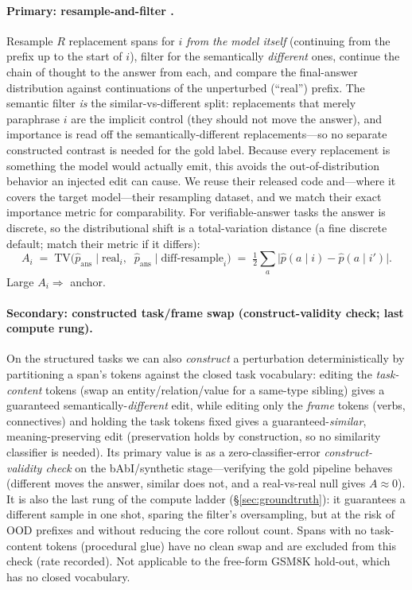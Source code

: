 \documentclass[11pt]{article}
\begin{document}
\paragraph{Primary: resample-and-filter \cite{bogdan2025thought}.} Resample $R$ replacement spans for
$i$ \emph{from the model itself} (continuing from the prefix up to the start of $i$), filter for the
semantically \emph{different} ones, continue the chain of thought to the answer from each, and compare
the final-answer distribution against continuations of the unperturbed (``real'') prefix. The semantic
filter \emph{is} the similar-vs-different split: replacements that merely paraphrase $i$ are the
implicit control (they should not move the answer), and importance is read off the
semantically-different replacements---so no separate constructed contrast is needed for the gold label.
Because every replacement is something the model would actually emit, this avoids the
out-of-distribution behavior an injected edit can cause. We reuse their released code and---where it
covers the target model---their resampling dataset, and we match their exact importance metric for
comparability. For verifiable-answer tasks the answer is discrete, so the distributional shift is a
total-variation distance (a fine discrete default; match their metric if it differs):
\begin{equation}
A_i \;=\; \mathrm{TV}\!\Big(\hat p_{\text{ans}}\!\mid\!\text{real}_i,\;\;\hat p_{\text{ans}}\!\mid\!\text{diff-resample}_i\Big)
\;=\;\tfrac12\sum_a\big|\hat p(a\mid i)-\hat p(a\mid i')\big|.
\label{eq:label}
\end{equation}
Large $A_i\Rightarrow$ anchor.

\paragraph{Secondary: constructed task/frame swap (construct-validity check; last compute rung).}
On the structured tasks we can also \emph{construct} a perturbation deterministically by partitioning a
span's tokens against the closed task vocabulary: editing the \emph{task-content} tokens (swap an
entity/relation/value for a same-type sibling) gives a guaranteed semantically-\emph{different} edit,
while editing only the \emph{frame} tokens (verbs, connectives) and holding the task tokens fixed gives
a guaranteed-\emph{similar}, meaning-preserving edit (preservation holds by construction, so no
similarity classifier is needed). Its primary value is as a zero-classifier-error
\emph{construct-validity check} on the bAbI/synthetic stage---verifying the gold pipeline behaves
(different moves the answer, similar does not, and a real-vs-real null gives $A\!\approx\!0$). It is
also the last rung of the compute ladder (\S\ref{sec:groundtruth}): it guarantees a different sample in
one shot, sparing the filter's oversampling, but at the risk of OOD prefixes and without reducing the
core rollout count. Spans with no task-content tokens (procedural glue) have no clean swap and are
excluded from this check (rate recorded). Not applicable to the free-form GSM8K hold-out, which has no
closed vocabulary.
\end{document}
